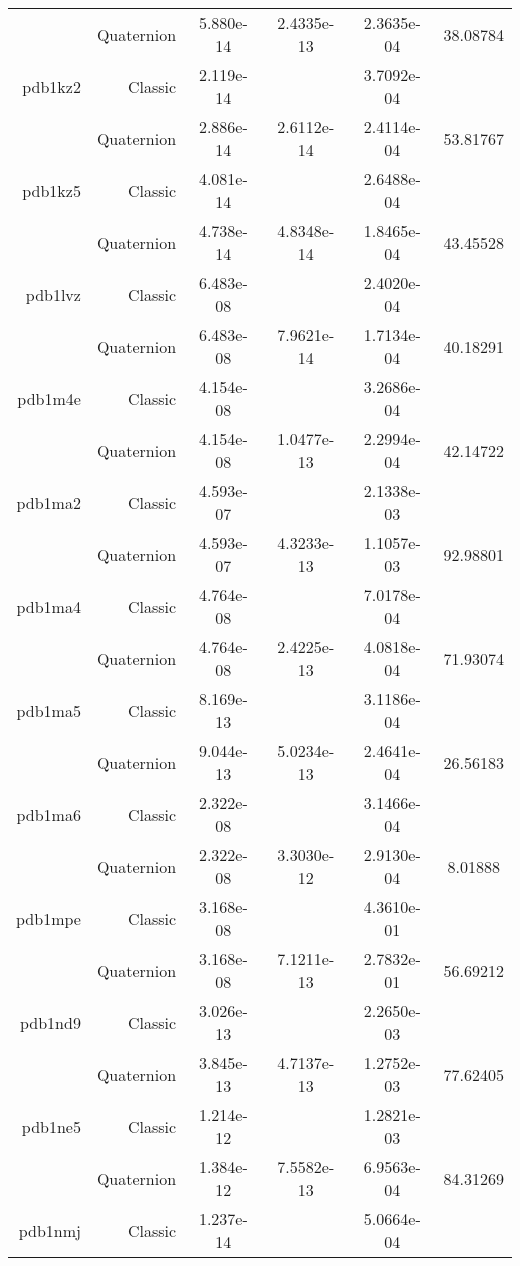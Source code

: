 \begin{xltabular}{\textwidth}{r|rS[table-format=1.3e+2]S[table-format=1.4e+2]S[table-format=1.4e+2]S[table-format=-1.5]}
& Quaternion & 5.880e-14 & 2.4335e-13 & 2.3635e-04 & 38.08784\\  \addlinespace
pdb1kz2 & Classic & 2.119e-14 &  & 3.7092e-04 & \\
& Quaternion & 2.886e-14 & 2.6112e-14 & 2.4114e-04 & 53.81767\\  \addlinespace
pdb1kz5 & Classic & 4.081e-14 &  & 2.6488e-04 & \\
& Quaternion & 4.738e-14 & 4.8348e-14 & 1.8465e-04 & 43.45528\\  \addlinespace
pdb1lvz & Classic & 6.483e-08 &  & 2.4020e-04 & \\
& Quaternion & 6.483e-08 & 7.9621e-14 & 1.7134e-04 & 40.18291\\  \addlinespace
pdb1m4e & Classic & 4.154e-08 &  & 3.2686e-04 & \\
& Quaternion & 4.154e-08 & 1.0477e-13 & 2.2994e-04 & 42.14722\\  \addlinespace
pdb1ma2 & Classic & 4.593e-07 &  & 2.1338e-03 & \\
& Quaternion & 4.593e-07 & 4.3233e-13 & 1.1057e-03 & 92.98801\\  \addlinespace
pdb1ma4 & Classic & 4.764e-08 &  & 7.0178e-04 & \\
& Quaternion & 4.764e-08 & 2.4225e-13 & 4.0818e-04 & 71.93074\\  \addlinespace
pdb1ma5 & Classic & 8.169e-13 &  & 3.1186e-04 & \\
& Quaternion & 9.044e-13 & 5.0234e-13 & 2.4641e-04 & 26.56183\\  \addlinespace
pdb1ma6 & Classic & 2.322e-08 &  & 3.1466e-04 & \\
& Quaternion & 2.322e-08 & 3.3030e-12 & 2.9130e-04 & 8.01888\\  \addlinespace
pdb1mpe & Classic & 3.168e-08 &  & 4.3610e-01 & \\
& Quaternion & 3.168e-08 & 7.1211e-13 & 2.7832e-01 & 56.69212\\  \addlinespace
pdb1nd9 & Classic & 3.026e-13 &  & 2.2650e-03 & \\
& Quaternion & 3.845e-13 & 4.7137e-13 & 1.2752e-03 & 77.62405\\  \addlinespace
pdb1ne5 & Classic & 1.214e-12 &  & 1.2821e-03 & \\
& Quaternion & 1.384e-12 & 7.5582e-13 & 6.9563e-04 & 84.31269\\  \addlinespace
pdb1nmj & Classic & 1.237e-14 &  & 5.0664e-04 & \\

\end{xltabular}
